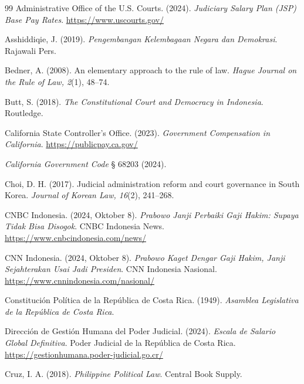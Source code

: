 \documentclass[12pt, a4paper]{article}
\begin{document}
\newpage
\pagestyle{empty}
\renewcommand{\refname}{\textbf{REFERENCES}}
\begin{thebibliography}{99}
Administrative Office of the U.S. Courts. (2024). \textit{Judiciary Salary Plan (JSP) Base Pay Rates}. \url{https://www.uscourts.gov/}

Asshiddiqie, J. (2019). \textit{Pengembangan Kelembagaan Negara dan Demokrasi}. Rajawali Pers.

Bedner, A. (2008). An elementary approach to the rule of law. \textit{Hague Journal on the Rule of Law, 2}(1), 48--74.

Butt, S. (2018). \textit{The Constitutional Court and Democracy in Indonesia}. Routledge.

California State Controller's Office. (2023). \textit{Government Compensation in California}. \url{https://publicpay.ca.gov/}

\textit{California Government Code} § 68203 (2024).

Choi, D. H. (2017). Judicial administration reform and court governance in South Korea. \textit{Journal of Korean Law, 16}(2), 241--268.

CNBC Indonesia. (2024, Oktober 8). \textit{Prabowo Janji Perbaiki Gaji Hakim: Supaya Tidak Bisa Disogok}. CNBC Indonesia News. \url{https://www.cnbcindonesia.com/news/}

CNN Indonesia. (2024, Oktober 8). \textit{Prabowo Kaget Dengar Gaji Hakim, Janji Sejahterakan Usai Jadi Presiden}. CNN Indonesia Nasional. \url{https://www.cnnindonesia.com/nasional/}

Constitución Política de la República de Costa Rica. (1949). \textit{Asamblea Legislativa de la República de Costa Rica}.

Dirección de Gestión Humana del Poder Judicial. (2024). \textit{Escala de Salario Global Definitiva}. Poder Judicial de la República de Costa Rica. \url{https://gestionhumana.poder-judicial.go.cr/}

Cruz, I. A. (2018). \textit{Philippine Political Law}. Central Book Supply.


\end{thebibliography}
\end{document}
